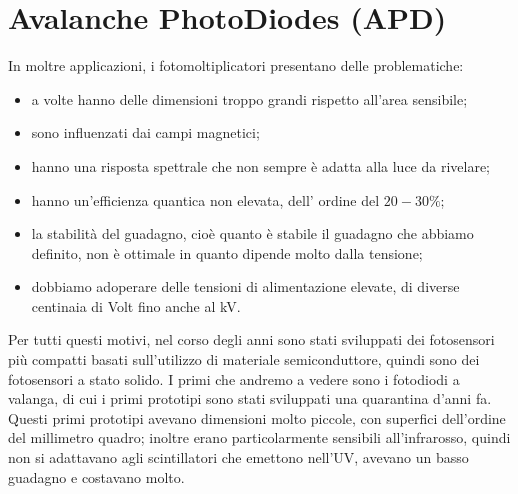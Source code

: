 \section{Avalanche PhotoDiodes (APD)}
In moltre applicazioni, i fotomoltiplicatori presentano delle problematiche:
\begin{itemize}
   \item a volte hanno delle dimensioni troppo grandi rispetto all'area sensibile;
   \item sono influenzati dai campi magnetici;
   \item hanno una risposta spettrale che non sempre è adatta alla luce da rivelare;
   \item hanno un'efficienza quantica non elevata, dell' ordine del $20-30\%$;
   \item la stabilità del guadagno, cioè quanto è stabile il guadagno che abbiamo definito, non è ottimale in quanto dipende molto dalla tensione;
   \item dobbiamo adoperare delle tensioni di alimentazione elevate, di diverse centinaia di Volt fino anche al kV.
\end{itemize}
Per tutti questi motivi, nel corso degli anni sono stati sviluppati dei fotosensori più compatti basati sull'utilizzo di materiale semiconduttore, quindi sono dei fotosensori a stato solido. I primi che andremo a vedere sono i fotodiodi a valanga, di cui i primi prototipi sono stati sviluppati una quarantina d'anni fa. Questi primi prototipi avevano dimensioni molto piccole, con superfici dell'ordine del millimetro quadro; inoltre erano particolarmente sensibili all'infrarosso, quindi non si adattavano agli scintillatori che emettono nell'UV, avevano un basso guadagno e costavano molto.

